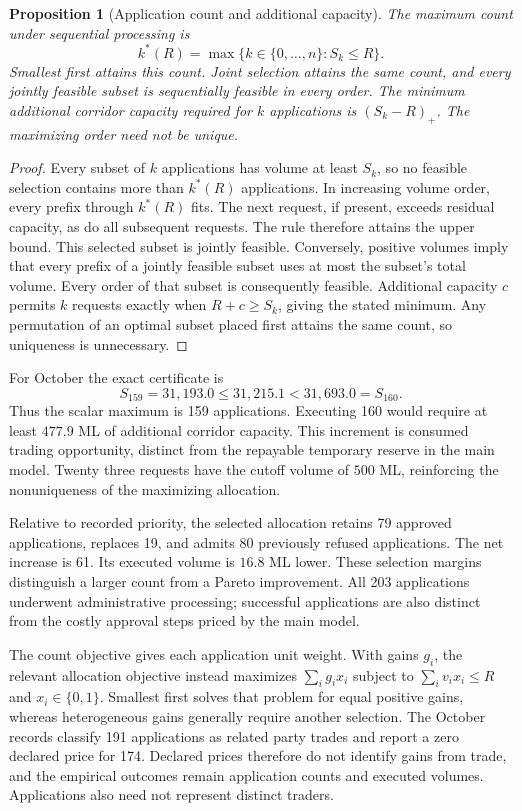 \documentclass[ecta,draft,supplement]{econsocart}
\newtheorem{proposition}[theorem]{Proposition}
\theoremstyle{definition}
\theoremstyle{definition}
\begin{document}
\begin{appendix}
\begin{proposition}[Application count and additional capacity]
\label{prop:watercardinality}
The maximum count under sequential processing is
\[
 k^*(R)=\max\{k\in\{0,\ldots,n\}:S_k\le R\}.
\]
Smallest first attains this count. Joint selection attains the same count,
and every jointly feasible subset is sequentially feasible in every
order. The minimum additional corridor capacity required for $k$
applications is $(S_k-R)_+$. The maximizing order need not be unique.
\end{proposition}

\begin{proof}
Every subset of $k$ applications has volume at least $S_k$, so no feasible
selection contains more than $k^*(R)$ applications. In increasing volume
order, every prefix through $k^*(R)$ fits. The next request, if present,
exceeds residual capacity, as do all subsequent requests. The rule
therefore attains the upper bound. This selected subset is jointly
feasible. Conversely, positive volumes imply that every prefix of a
jointly feasible subset uses at most the subset's total volume. Every
order of that subset is consequently feasible. Additional capacity $c$
permits $k$ requests exactly when $R+c\ge S_k$, giving the stated minimum.
Any permutation of an optimal subset placed first attains the same count,
so uniqueness is unnecessary.
\end{proof}

For October the exact certificate is
\[
 S_{159}=31{,}193.0\le31{,}215.1<31{,}693.0=S_{160}.
\]
Thus the scalar maximum is 159 applications. Executing 160 would require
at least $477.9$ ML of additional corridor capacity. This increment is
consumed trading opportunity, distinct from the repayable temporary
reserve in the main model. Twenty three requests have the cutoff volume
of $500$ ML, reinforcing the nonuniqueness of the maximizing allocation.

Relative to recorded priority, the selected allocation retains 79
approved applications, replaces 19, and admits 80 previously refused
applications. The net increase is 61. Its executed volume is $16.8$ ML
lower. These selection margins distinguish a larger count from a Pareto
improvement. All 203 applications underwent administrative processing;
successful applications are also distinct from the costly approval
steps priced by the main model.

The count objective gives each application unit weight. With gains
$g_i$, the relevant allocation objective instead maximizes
$\sum_i g_i x_i$ subject to $\sum_i v_i x_i\le R$ and
$x_i\in\{0,1\}$. Smallest first solves that problem for equal positive
gains, whereas heterogeneous gains generally require another selection.
The October records classify 191 applications as related party trades
and report a zero declared price for 174. Declared prices therefore do
not identify gains from trade, and the empirical outcomes remain
application counts and executed volumes. Applications also need not
represent distinct traders.


\end{appendix}
\end{document}
